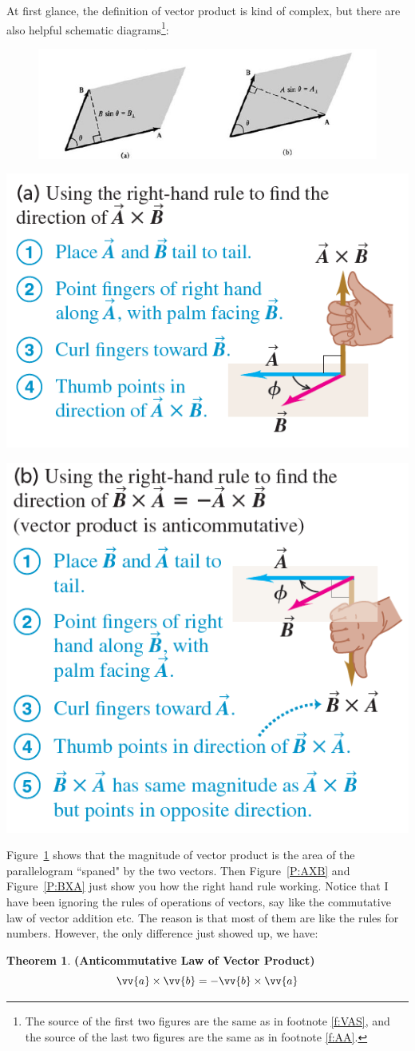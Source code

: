 \documentclass[12pt, a4paper, reqno]{amsart}
\theoremstyle{definition}
\newtheorem{theorem}{Theorem}[subsection] %
\numberwithin{equation}{section} %
\begin{document}
At first glance, the definition of vector product is kind of complex, but there are also helpful schematic diagrams\footnote{The source of the first two figures are the same as in footnote \ref{f:VAS}, and the source of the last two figures are the same as in footnote \ref{f:AA}.}\label{f:Cross}:

\begin{figure}[h]
	\centering\includegraphics[width=.6\linewidth]{7.png}
	\caption{}
	\label{P:MoVP}
\end{figure}
\begin{minipage}{.5\textwidth}
	\centering
	\includegraphics[width=.6\linewidth]{8.png}
	\label{P:AXB}
\end{minipage}%
\begin{minipage}{.5\textwidth}
	\centering
	\includegraphics[width=.6\linewidth]{9.png}
	\label{P:BXA}
\end{minipage}

Figure~\ref{P:MoVP} shows that the magnitude of vector product is the area of the parallelogram ``spaned" by the two vectors. Then Figure~\ref{P:AXB} and Figure~\ref{P:BXA} just show you how the right hand rule working. Notice that I have been ignoring the rules of operations of vectors, say like the commutative law of vector addition etc. The reason is that most of them are like the rules for numbers. However, the only difference just showed up, we have:
\begin{theorem}\label{T:AC} \textbf{(Anticommutative Law of Vector Product)}
	\begin{equation}
		\vv{a}\times \vv{b} = - \vv{b}\times \vv{a}
	\end{equation}
\end{theorem}
\end{document}
